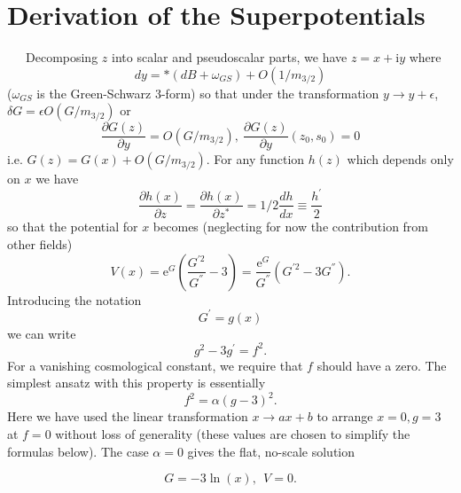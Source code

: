 \documentclass[a4paper,12pt]{article}
\begin{document}
\section{Derivation of the Superpotentials}
\ \ \  Decomposing $z$ into scalar and pseudoscalar parts, we have
$z = x + \mathrm{i}y$ where
 \begin{equation}\label{y}
    dy  = *(dB + \omega_{GS}) + O(1/m_{3/2})
\end{equation}
($\omega_{GS}$ is the Green-Schwarz 3-form) so that under the
transformation $y \rightarrow y + \epsilon$, $\delta G = \epsilon
O(G/m_{3/2})$ or
\begin{equation}\label{z}
 \frac{\partial G(z)}{\partial y} = O(G/m_{3/2}),\  \frac{\partial G(z)}{\partial
 y}(z_{0},s_{0})=0
\end{equation}
i.e. $G(z) = G(x) + O(G/m_{3/2})$. For any function $h(z)$ which
depends only on $x$ we have
\begin{equation}\label{PD}
   \frac{\partial h(x)}{\partial z} = \frac{\partial h(x)}{\partial
   z^{*}} =  1/2 \frac{dh}{dx} \equiv \frac{h^{'}}{2}
\end{equation}
so that the potential for $x$ becomes (neglecting for now the
contribution from other fields)
\begin{equation}\label{V1}
 V(x) = \mathrm{e}^{G}(\frac{G^{'2}}{G^{''}}-3) =
 \frac{\mathrm{e}^{G}}{G^{''}}(G^{'2}-3G^{''}).
\end{equation}
Introducing the notation
\begin{equation}\label{g}
    G^{'} = g(x)
\end{equation}
we can write
\begin{equation}\label{f}
    g^{2} - 3g^{'} = f^{2}.
\end{equation}
For a vanishing cosmological constant, we require that $f$ should
have a zero. The simplest ansatz with this property is essentially
\begin{equation}\label{A}
f^{2} = \alpha (g-3)^{2}.
\end{equation}
Here we have used the linear transformation $x \rightarrow ax+b$
to arrange $x = 0, g = 3$ at $f = 0$ without loss of generality
(these values are chosen to simplify the formulas below). The case
$\alpha = 0$ gives the flat, no-scale solution

\begin{equation}\label{P}
G = -3\ln{(x)},\  \ V=0.
\end{equation}
\end{document}
